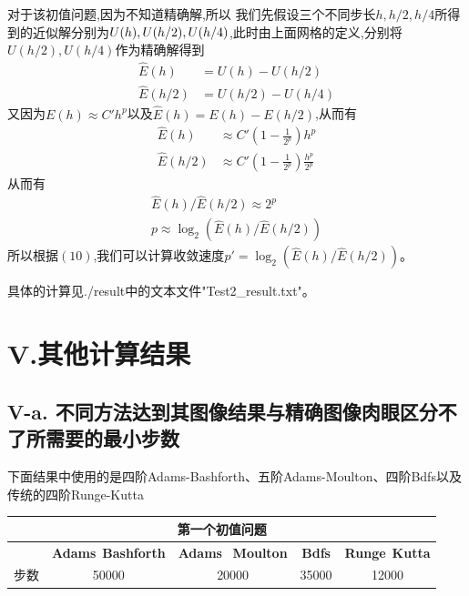 \documentclass[twoside,a4paper]{article}
\begin{document}
对于该初值问题,因为不知道精确解,所以
我们先假设三个不同步长$h,h/2,h/4$所得到的近似解分别为$U(h),U(h/2),\\[2pt]U(h/4)$,此时由上面网格的定义,分别将$U(h/2),U(h/4)$作为精确解得到
    \begin{align}
        \hat{E}(h)   & =U(h)-U(h/2)   \\
        \hat{E}(h/2) & =U(h/2)-U(h/4)
    \end{align}
    又因为$E(h)\approx C'h^p$以及$\hat{E}(h)=E(h)-E(h/2)$,从而有
    \begin{align}
        \hat{E}(h)   & \approx C'(1-\frac{1}{2^p})h^p             \\
        \hat{E}(h/2) & \approx C'(1-\frac{1}{2^p})\frac{h^p}{2^p}
    \end{align}
    从而有
    \begin{align}
        \hat{E}(h)/\hat{E}(h/2)  \approx 2^p \\
        p                        \approx \log_2(\hat{E}(h)/\hat{E}(h/2))
    \end{align}
    所以根据$(10)$,我们可以计算收敛速度$p'=\log_2(\hat{E}(h)/\hat{E}(h/2))$。

具体的计算见./result中的文本文件"Test2\_result.txt"。

\section*{V.其他计算结果}
\subsection*{V-a. 不同方法达到其图像结果与精确图像肉眼区分不了所需要的最小步数}
\hspace{0.8em}
下面结果中使用的是四阶Adams-Bashforth、五阶Adams-Moulton、四阶Bdfs以及传统的四阶Runge-Kutta
\\[5pt]
\centering
\renewcommand{\arraystretch}{1.5}
\begin{tabular}{|c|c|c|c|c|}
    \multicolumn{5}{c}{\textbf{第一个初值问题}}                                                                                    \\
    \hline
         & \textbf{Adams}\ \textbf{Bashforth} & \textbf{Adams} \ \textbf{Moulton} & \textbf{Bdfs} & \textbf{Runge}\ \textbf{Kutta} \\
    \hline
    步数 & 50000                              & 20000                             & 35000         & 12000                          \\
    \hline
\end{tabular}
\end{document}
